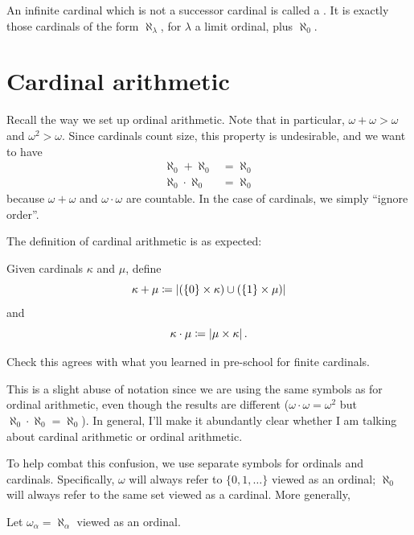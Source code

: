 \begin{definition}
	An infinite cardinal which is not a successor cardinal
	is called a .
	It is exactly those cardinals of the form $\aleph_\lambda$,
	for $\lambda$ a limit ordinal, plus $\aleph_0$.
\end{definition}


\section{Cardinal arithmetic}
Recall the way we set up ordinal arithmetic.
Note that in particular, $\omega + \omega > \omega$ and $\omega^2 > \omega$.
Since cardinals count size, this property is undesirable, and
we want to have
\begin{align*}
	\aleph_0 + \aleph_0 &= \aleph_0 \\
	\aleph_0 \cdot \aleph_0 &= \aleph_0
\end{align*}
because $\omega + \omega$ and $\omega \cdot \omega$ are countable.
In the case of cardinals, we simply ``ignore order''.

The definition of cardinal arithmetic is as expected:
\begin{definition}
	Given cardinals $\kappa$ and $\mu$, define
	\[ \kappa + \mu
		\coloneqq
		\left\lvert
		\left( \left\{ 0 \right\} \times \kappa \right)
		\cup
		\left( \left\{ 1 \right\} \times \mu \right)
		\right\rvert
	\]
	and
	\[
		\kappa \cdot \mu
		\coloneqq
		\left\lvert \mu \times \kappa \right\rvert
		.
	\]
\end{definition}


\begin{ques}
	Check this agrees with what you learned in pre-school
	for finite cardinals.
\end{ques}

\begin{abuse}
	This is a slight abuse of notation since we are using
	the same symbols as for ordinal arithmetic,
	even though the results are different ($\omega \cdot \omega = \omega^2$
	but $\aleph_0 \cdot \aleph_0 = \aleph_0$).
	In general, I'll make it abundantly clear whether I am talking
	about cardinal arithmetic or ordinal arithmetic.
\end{abuse}
To help combat this confusion, we use separate symbols for ordinals and cardinals.
Specifically, $\omega$ will always refer to $\{0,1,\dots\}$ viewed as an ordinal;
$\aleph_0$ will always refer to the same set viewed as a cardinal.
More generally,
\begin{definition}
	Let $\omega_\alpha = \aleph_\alpha$ viewed as an ordinal.
\end{definition}

